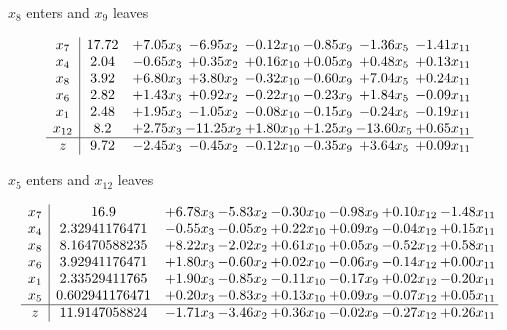 \documentclass[8pt]{article}
\begin{document}
 $ x_{8} $ enters and $ x_{9} $ leaves 

 \[\begin{array}{c| c c@{\hskip 2pt} c@{\hskip 2pt} c@{\hskip 2pt} c@{\hskip 2pt} c@{\hskip 2pt} c@{\hskip 2pt} }
 x_{7}   &  17.72 & +  7.05 x_{3} & -6.95 x_{2} & -0.12 x_{10} & -0.85 x_{9} & -1.36 x_{5} & -1.41 x_{11}\\
 x_{4}   &  2.04 & -0.65 x_{3} & +  0.35 x_{2} & +  0.16 x_{10} & +  0.05 x_{9} & +  0.48 x_{5} & +  0.13 x_{11}\\
 x_{8}   &  3.92 & +  6.80 x_{3} & +  3.80 x_{2} & -0.32 x_{10} & -0.60 x_{9} & +  7.04 x_{5} & +  0.24 x_{11}\\
 x_{6}   &  2.82 & +  1.43 x_{3} & +  0.92 x_{2} & -0.22 x_{10} & -0.23 x_{9} & +  1.84 x_{5} & -0.09 x_{11}\\
 x_{1}   &  2.48 & +  1.95 x_{3} & -1.05 x_{2} & -0.08 x_{10} & -0.15 x_{9} & -0.24 x_{5} & -0.19 x_{11}\\
 x_{12}   &  8.2 & +  2.75 x_{3} & -11.25 x_{2} & +  1.80 x_{10} & +  1.25 x_{9} & -13.60 x_{5} & +  0.65 x_{11}\\
\hline
z    &  9.72 & -2.45 x_{3} & -0.45 x_{2} & -0.12 x_{10} & -0.35 x_{9} & +  3.64 x_{5} & +  0.09 x_{11}\\
\end{array}\]


 $ x_{5} $ enters and $ x_{12} $ leaves 

 \[\begin{array}{c| c c@{\hskip 2pt} c@{\hskip 2pt} c@{\hskip 2pt} c@{\hskip 2pt} c@{\hskip 2pt} c@{\hskip 2pt} }
 x_{7}   &  16.9 & +  6.78 x_{3} & -5.83 x_{2} & -0.30 x_{10} & -0.98 x_{9} & +  0.10 x_{12} & -1.48 x_{11}\\
 x_{4}   &  2.32941176471 & -0.55 x_{3} & -0.05 x_{2} & +  0.22 x_{10} & +  0.09 x_{9} & -0.04 x_{12} & +  0.15 x_{11}\\
 x_{8}   &  8.16470588235 & +  8.22 x_{3} & -2.02 x_{2} & +  0.61 x_{10} & +  0.05 x_{9} & -0.52 x_{12} & +  0.58 x_{11}\\
 x_{6}   &  3.92941176471 & +  1.80 x_{3} & -0.60 x_{2} & +  0.02 x_{10} & -0.06 x_{9} & -0.14 x_{12} & +  0.00 x_{11}\\
 x_{1}   &  2.33529411765 & +  1.90 x_{3} & -0.85 x_{2} & -0.11 x_{10} & -0.17 x_{9} & +  0.02 x_{12} & -0.20 x_{11}\\
 x_{5}   &  0.602941176471 & +  0.20 x_{3} & -0.83 x_{2} & +  0.13 x_{10} & +  0.09 x_{9} & -0.07 x_{12} & +  0.05 x_{11}\\
\hline
z    &  11.9147058824 & -1.71 x_{3} & -3.46 x_{2} & +  0.36 x_{10} & -0.02 x_{9} & -0.27 x_{12} & +  0.26 x_{11}\\
\end{array}\]
\end{document}
